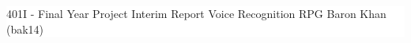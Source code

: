 \documentclass[12pt]{article}
\date{16 March 2017}
\begin{document}
\vspace*{6cm}
\colorbox{white}{
	\parbox[t]{1.0\linewidth}{
		\centering \fontsize{50pt}{80pt}\selectfont %
		\vspace*{0.7cm} %
		
		{401I - Final Year Project} \break
		\vspace*{0.7cm}
		Interim Report
		\break
		Voice Recognition RPG
		\break
		Baron Khan (bak14)
		\vspace*{0.7cm} %
	}
}
\vfill %




\newpage
\thispagestyle{empty}
\tableofcontents
\newpage
\setcounter{page}{1}
\end{document}
